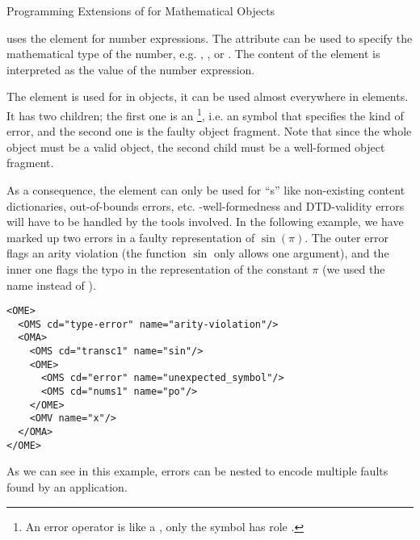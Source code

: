 \begin{omgroup}[id=mobj,short=Mathematical Objects]
\begin{omgroup}[id=om.error]{Programming Extensions of for Mathematical Objects}
\begin{definition}
  \cmathml uses the  element for number expressions. The attribute
   can be used to specify the mathematical type of the
  number, e.g. {}, {}, or {}. The content
  of the  element is interpreted as the value of the number
  expression.
\end{definition}

\begin{definition}[id=ome.def]
  The {} element is used for {} in
  {\openmath} objects, it can be used almost everywhere in {\openmath} elements. It has
  two children; the first one is an {}\footnote{An error operator
    is like a {}, only the symbol has role
    .}, i.e. an {\openmath} symbol that specifies the kind
  of error, and the second one is the faulty {\openmath} object fragment. Note that since
  the whole object must be a valid {\openmath} object, the second child must be a
  well-formed {\openmath} object fragment.
\end{definition}
As a consequence, the  element can only be used for
``{s}'' like non-existing content dictionaries, out-of-bounds
errors, etc.  {\xml}-well-formedness and DTD-validity errors will have to be handled by
the {\xml} tools involved. In the following example, we have marked up two errors in a
faulty representation of $\sin(\pi)$.  The outer error flags an arity violation (the
function $\sin$ only allows one argument), and the inner one flags the typo in the
representation of the constant $\pi$ (we used the name {} instead of
{}).

\begin{lstlisting}[label=ome,language=OpenMath,numbers=none,index={OME}]
<OME>
  <OMS cd="type-error" name="arity-violation"/>
  <OMA>
    <OMS cd="transc1" name="sin"/>
    <OME>
      <OMS cd="error" name="unexpected_symbol"/>
      <OMS cd="nums1" name="po"/>
    </OME>
    <OMV name="x"/>
  </OMA>
</OME>
\end{lstlisting}
  As we can see in this example, errors can be nested to encode multiple faults found by
  an {\openmath} application.

\end{omgroup}


\end{omgroup}
